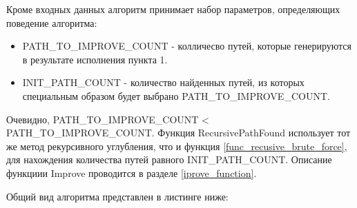 Кроме входных данных алгоритм принимает набор параметров, определяющих поведение алгоритма:

\begin{itemize}
	\item PATH\_TO\_IMPROVE\_COUNT - колличесво путей, которые генерируются в результате исполнения пункта 1.
	\item INIT\_PATH\_COUNT - количество найденных путей, из которых специальным образом будет выбрано PATH\_TO\_IMPROVE\_COUNT.
\end{itemize}
Очевидно, PATH\_TO\_IMPROVE\_COUNT < PATH\_TO\_IMPROVE\_COUNT. Функция RecursivePathFound использует тот же метод рекурсивного углубления, что и функция \ref{func_recusive_brute_force}, для нахождения количества путей равного INIT\_PATH\_COUNT. Описание функциии Improve проводится в разделе \ref{iprove_function}.

Общий вид алгоритма представлен в листинге ниже:


